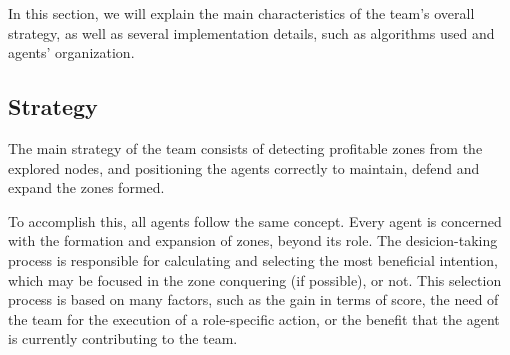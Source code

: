 \documentclass{llncs2e/llncs}
\begin{document}
    
    In this section, we will explain the main characteristics of the team's 
	overall strategy, as well as several implementation details, such as 
	algorithms used and agents' organization.

    
\subsection{Strategy}

    The main strategy of the team consists of detecting profitable zones from the 
    explored nodes, and positioning the agents correctly to maintain, defend 
    and expand the zones formed. 
    
    To accomplish this, all agents follow the same concept. Every agent is concerned 
    with the formation and expansion of zones, beyond its role.
    The desicion-taking process is responsible for calculating and selecting the
    most beneficial intention, which may be focused in the zone conquering (if possible),
    or not.
    This selection process is based on many factors, such as the gain in terms 
    of score, the need of the team for the execution of a role-specific action, or
    the benefit that the agent is currently contributing to the team. 
    
\end{document}
